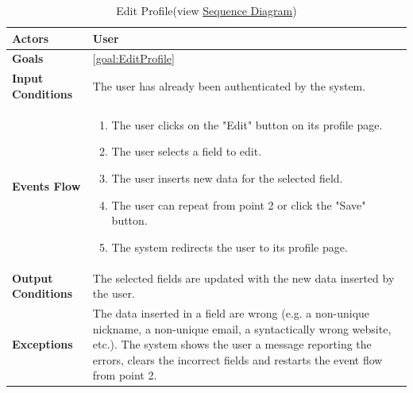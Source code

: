 \begin{table}[H]
	\centering
	\def\arraystretch{1.5}
	\begin{tabular}{|m{7cm}|m{7cm}|}
		\hline
		\textbf{Actors}            & User		    \\ \hline
		\textbf{Goals}             & \ref{goal:EditProfile}          \\ \hline
		\textbf{Input Conditions}  & The user has already been authenticated by the system.           \\ \hline
		\textbf{Events Flow}       & 
			\begin{enumerate}[topsep=0pt, leftmargin=*]
				\item The user clicks on the "Edit" button on its profile page.
				\item The user selects a field to edit.
				\item The user inserts new data for the selected field.
				\item The user can repeat from point 2 or click the "Save" button.
				\item The system redirects the user to its profile page.
			\end{enumerate}           \\ \hline
		\textbf{Output Conditions} & The selected fields are updated with the new data inserted by the user.          \\ \hline
		\textbf{Exceptions}        &  The data inserted in a field are wrong (e.g. a non-unique nickname, a non-unique email, a syntactically wrong website, etc.). The system shows the user a message reporting the errors, clears the incorrect fields and restarts the event flow from point 2.               \\ \hline
	\end{tabular}
	\caption[Edit Profile]{{Edit Profile}\label{UseCaseDescr:EditProfile} (view \hyperref[SeqDiagr:EditProfile]{Sequence Diagram})}
\end{table}

